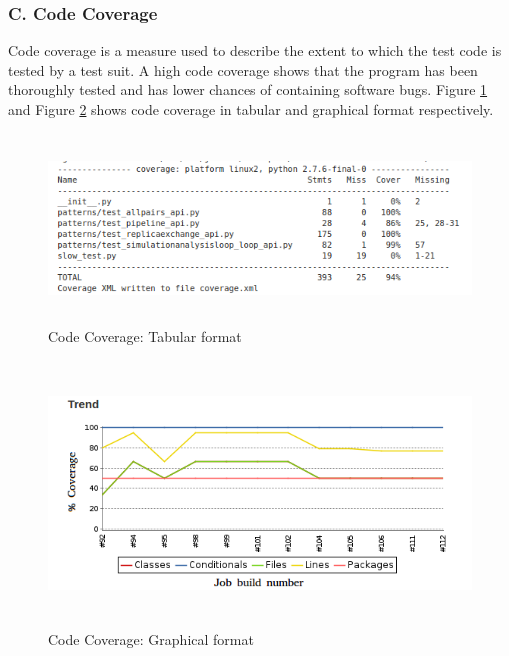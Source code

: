 \documentclass[10pt]{ruthesis}
\begin{document}
\subsubsection{\textbf{C. Code Coverage}}
Code coverage is a measure used to describe the extent to which the test code is tested by a test suit. A high code coverage shows that the program has been thoroughly tested and has lower chances of containing software bugs. Figure \ref{fig:cov_table} and Figure \ref{fig:cov_graph} shows code coverage in tabular and graphical format respectively.

\begin{figure}
 \begin{center}
  \includegraphics[width=15cm,height=5cm]{code_cov.png}
  \caption{Code Coverage: Tabular format}
  \label{fig:cov_table}
  \end{center}
\end{figure}


\begin{figure}
 \begin{center}
  \includegraphics[width=15cm,height=7cm]{cov_graph.png}
  \caption{Code Coverage: Graphical format}
  \label{fig:cov_graph}
  \end{center}
\end{figure}
\end{document}
